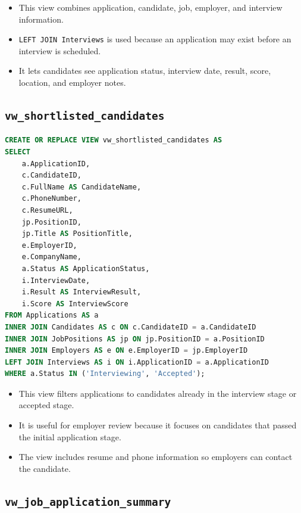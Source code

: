 \documentclass[11pt,a4paper]{report}
\begin{document}
\begin{itemize}[leftmargin=1.2cm,itemsep=0.1em]
  \item This view combines application, candidate, job, employer, and interview information.
  \item \texttt{LEFT JOIN Interviews} is used because an application may exist before an interview is scheduled.
  \item It lets candidates see application status, interview date, result, score, location, and employer notes.
\end{itemize}

\subsection*{\texttt{vw\_shortlisted\_candidates}}

\begin{lstlisting}[language=SQL,caption={View for shortlisted candidates}]
CREATE OR REPLACE VIEW vw_shortlisted_candidates AS
SELECT
    a.ApplicationID,
    c.CandidateID,
    c.FullName AS CandidateName,
    c.PhoneNumber,
    c.ResumeURL,
    jp.PositionID,
    jp.Title AS PositionTitle,
    e.EmployerID,
    e.CompanyName,
    a.Status AS ApplicationStatus,
    i.InterviewDate,
    i.Result AS InterviewResult,
    i.Score AS InterviewScore
FROM Applications AS a
INNER JOIN Candidates AS c ON c.CandidateID = a.CandidateID
INNER JOIN JobPositions AS jp ON jp.PositionID = a.PositionID
INNER JOIN Employers AS e ON e.EmployerID = jp.EmployerID
LEFT JOIN Interviews AS i ON i.ApplicationID = a.ApplicationID
WHERE a.Status IN ('Interviewing', 'Accepted');
\end{lstlisting}

\begin{itemize}[leftmargin=1.2cm,itemsep=0.1em]
  \item This view filters applications to candidates already in the interview stage or accepted stage.
  \item It is useful for employer review because it focuses on candidates that passed the initial application stage.
  \item The view includes resume and phone information so employers can contact the candidate.
\end{itemize}

\subsection*{\texttt{vw\_job\_application\_summary}}
\end{document}
